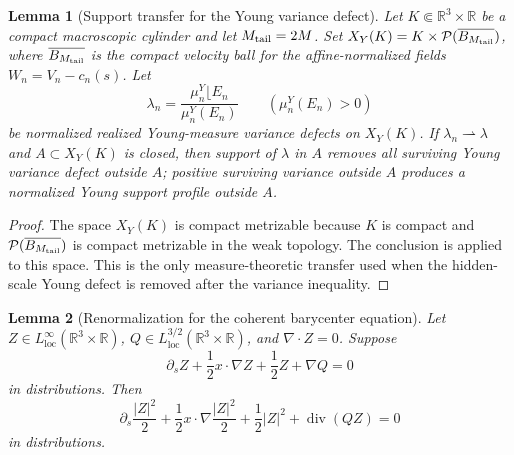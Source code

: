 \documentclass[11pt]{amsart}
\numberwithin{equation}{section}
\theoremstyle{plain}
\newtheorem{lemma}[lemma]{Lemma}
\theoremstyle{definition}
\theoremstyle{remark}
\newcommand{\loc}{\mathrm{loc}}
\newcommand{\divergence}{\operatorname{div}}
\begin{document}
\begin{lemma}[Support transfer for the Young variance defect]
\label{lem:young-variance-support-transfer}
Let \(K\Subset\mathbb R^3\times\mathbb R\) be a compact macroscopic cylinder
and let \(M_{\rm tail}=2M\).  Set
\(X_Y(K)=K\times\mathcal P(\overline{B_{M_{\rm tail}}})\), where
\(\overline{B_{M_{\rm tail}}}\) is the compact velocity ball for the
affine-normalized fields \(W_n=V_n-c_n(s)\).  Let
\[
   \lambda_n=\frac{\mu_n^Y\lfloor E_n}{\mu_n^Y(E_n)}
   \qquad(\mu_n^Y(E_n)>0)
\]
be normalized realized Young-measure variance defects on \(X_Y(K)\).  If
\(\lambda_n\rightharpoonup\lambda\) and \(A\subset X_Y(K)\) is closed, then
support of \(\lambda\) in \(A\) removes all surviving Young variance defect
outside \(A\); positive surviving variance outside \(A\) produces a normalized
Young support profile outside \(A\).
\end{lemma}

\begin{proof}
The space \(X_Y(K)\) is compact metrizable because \(K\) is compact and
\(\mathcal P(\overline{B_{M_{\rm tail}}})\) is compact metrizable in the weak
topology.
The conclusion is  applied to this
space.  This is the only measure-theoretic transfer used when the hidden-scale
Young defect is removed after the variance inequality.
\end{proof}

\begin{lemma}[Renormalization for the coherent barycenter equation]
\label{lem:coherent-barycenter-renormalization}
Let \(Z\in L^\infty_{\loc}(\mathbb R^3\times\mathbb R)\),
\(Q\in L^{3/2}_{\loc}(\mathbb R^3\times\mathbb R)\), and
\(\nabla\cdot Z=0\).  Suppose
\[
   \partial_s Z+\frac12 x\cdot\nabla Z+\frac12 Z+\nabla Q=0
\]
in distributions.  Then
\[
   \partial_s\frac{|Z|^2}{2}
   +\frac12x\cdot\nabla\frac{|Z|^2}{2}
   +\frac12|Z|^2
   +\divergence(QZ)=0
\]
in distributions.
\end{lemma}
\end{document}
